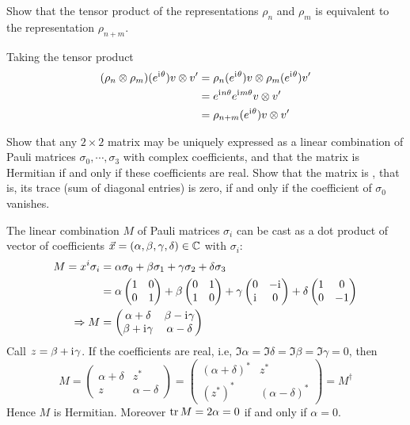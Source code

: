\documentclass[10pt]{article}
\begin{document}
\begin{example}
	Show that the tensor product of the representations $\rho_n$ and $\rho_m$ is equivalent to the representation $\rho_{n+m}$.
\end{example}
\sol Taking the tensor product
$$
\begin{aligned}
	(\rho_n \otimes \rho_m)(e^{\mathrm{i}\mkern1mu\theta})v \otimes v^\prime &= \rho_n(e^{\mathrm{i}\mkern1mu\theta})v \otimes \rho_m(e^{\mathrm{i}\mkern1mu\theta})v^\prime\\
	&= e^{\mathrm{i}\mkern1mu n\theta}e^{\mathrm{i}\mkern1mu m\theta} v \otimes v^\prime\\
	&= \rho_{n+m} (e^{\mathrm{i}\mkern1mu\theta})v \otimes v^\prime\\
\end{aligned}
$$


\begin{example}\label{b2e18}
	Show that any $2 \times 2$ matrix may be uniquely expressed as a linear combination of Pauli matrices $\sigma_0, \cdots, \sigma_3$ with complex coefficients, and that the matrix is Hermitian if and only if these coefficients are real. Show that the matrix is , that is, its trace (sum of diagonal entries) is zero, if and only if the coefficient of $\sigma_0$ vanishes.
\end{example}
\sol The linear combination $M$ of Pauli matrices $\sigma_i$ can be cast as a dot product of vector of coefficients $\vec{x} = (\alpha,\beta,\gamma,\delta) \in \mathbb{C}$ with $\sigma_i$:
$$
\begin{aligned}
	M = x^i\sigma_i &= \alpha\sigma_0 + \beta\sigma_1 + \gamma\sigma_2 + \delta\sigma_3\\
	&= \alpha\begin{pmatrix}
		1&0\\0&1
	\end{pmatrix}
	+ \beta\begin{pmatrix}
		0&1\\1&0
	\end{pmatrix}
	+ \gamma\begin{pmatrix}
		0&-\mathrm{i}\mkern1mu\\\mathrm{i}\mkern1mu&0
	\end{pmatrix}
	+ \delta\begin{pmatrix}
		1&0\\0&-1
	\end{pmatrix}\\
	\Rightarrow M &= \begin{pmatrix}
		\alpha+\delta&\beta-\mathrm{i}\mkern1mu\gamma\\\beta+\mathrm{i}\mkern1mu\gamma&\alpha-\delta
	\end{pmatrix}
\end{aligned}
$$
Call $z = \beta+\mathrm{i}\mkern1mu\gamma$. If the coefficients are real, i.e, $\Im\alpha = \Im\delta = \Im\beta = \Im\gamma = 0$, then
$$
M = \begin{pmatrix}
	\alpha+\delta&z^*\\z&\alpha-\delta
\end{pmatrix} = \begin{pmatrix}
	(\alpha+\delta)^*&z^*\\(z^*)^*&(\alpha-\delta)^*
\end{pmatrix} = M^\dag
$$
Hence $M$ is Hermitian. Moreover $\tr M = 2\alpha = 0$ if and only if $\alpha = 0$. 
\end{document}
